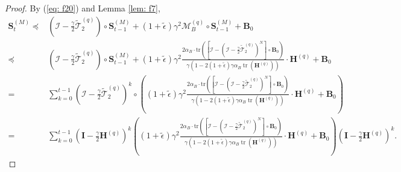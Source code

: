 \documentclass[11pt, letterpaper]{article}
\begin{document}
\begin{proof}
    By (\ref{eq: f20}) and Lemma \ref{lem: f7},
    \begin{equation*}
        \begin{aligned}
            \mathbf{S}_{t}^{(M)}\preceq&(\mathcal{I}-\frac{\gamma}{2}\widetilde{\mathcal{T}}_2^{(q)})\circ\mathbf{S}_{t-1}^{(M)}+(1+\tilde{\epsilon})\gamma^{2}\mathcal{M}_B^{(q)}\circ\mathbf{S}_{t-1}^{(M)}+\mathbf{B}_{0}\\
            \preceq&(\mathcal{I}-\frac{\gamma}{2}\widetilde{\mathcal{T}}_2^{(q)})\circ\mathbf{S}_{t-1}^{(M)}+(1+\tilde{\epsilon})\gamma^{2}\frac{2\alpha_B\cdot\mathrm{tr}\left(\left[\mathcal{I}-(\mathcal{I}-\frac{\gamma}{2}\widetilde{\mathcal{T}}_2^{(q)})^N\right]\circ\mathbf{B}_0\right)}{\gamma(1-2(1+\tilde{\epsilon})\gamma\alpha_B\operatorname{tr}(\mathbf{H}^{(q)}))}\cdot\mathbf{H}^{(q)}+\mathbf{B}_{0}\\
            =&\sum_{k=0}^{t-1}(\mathcal{I}-\frac{\gamma}{2}\widetilde{\mathcal{T}}_2^{(q)})^k\circ\left((1+\tilde{\epsilon})\gamma^{2}\frac{2\alpha_B\cdot\mathrm{tr}\left(\left[\mathcal{I}-(\mathcal{I}-\frac{\gamma}{2}\widetilde{\mathcal{T}}_2^{(q)})^N\right]\circ\mathbf{B}_0\right)}{\gamma(1-2(1+\tilde{\epsilon})\gamma\alpha_B\operatorname{tr}(\mathbf{H}^{(q)}))}\cdot\mathbf{H}^{(q)}+\mathbf{B}_{0}\right)\\
            =&\sum_{k=0}^{t-1}(\mathbf{I}-\frac{\gamma}{2}\mathbf{H}^{(q)})^k\left((1+\tilde{\epsilon})\gamma^{2}\frac{2\alpha_B\cdot\mathrm{tr}\left(\left[\mathcal{I}-(\mathcal{I}-\frac{\gamma}{2}\widetilde{\mathcal{T}}_2^{(q)})^N\right]\circ\mathbf{B}_0\right)}{\gamma(1-2(1+\tilde{\epsilon})\gamma\alpha_B\operatorname{tr}(\mathbf{H}^{(q)}))}\cdot\mathbf{H}^{(q)}+\mathbf{B}_{0}\right)(\mathbf{I}-\frac{\gamma}{2}\mathbf{H}^{(q)})^k.
        \end{aligned}
    \end{equation*}


\end{proof}
\end{document}
